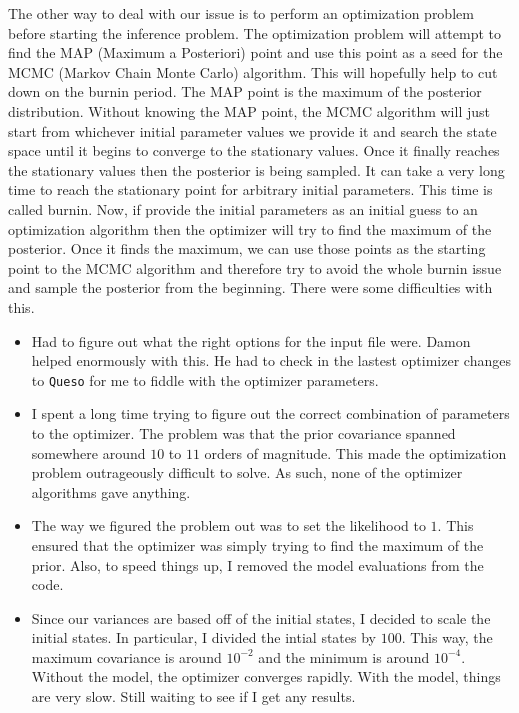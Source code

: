 The other way to deal with our issue is to perform an optimization problem before starting the inference problem.  The optimization problem will attempt to find the MAP (Maximum a Posteriori) point and use this point as a seed for the MCMC (Markov Chain Monte Carlo) algorithm.  This will hopefully help to cut down on the burnin period.  The MAP point is the maximum of the posterior distribution.  Without knowing the MAP point, the MCMC algorithm will just start from whichever initial parameter values we provide it and search the state space until it begins to converge to the stationary values.  Once it finally reaches the stationary values then the posterior is being sampled.  It can take a very long time to reach the stationary point for arbitrary initial parameters.  This time is called burnin.  Now, if provide the initial parameters as an initial guess to an optimization algorithm then the optimizer will try to find the maximum of the posterior.  Once it finds the maximum, we can use those points as the starting point to the MCMC algorithm and therefore try to avoid the whole burnin issue and sample the posterior from the beginning.  There were some difficulties with this.
\begin{itemize}
  \item Had to figure out what the right options for the input file were.  Damon helped enormously with this.  He had to check in the lastest optimizer changes to \texttt{Queso} for me to fiddle with the optimizer parameters.
  \item I spent a long time trying to figure out the correct combination of parameters to the optimizer.  The problem was that the prior covariance spanned somewhere around $10$ to $11$ orders of magnitude.  This made the optimization problem outrageously difficult to solve.  As such, none of the optimizer algorithms gave anything.
  \item The way we figured the problem out was to set the likelihood to $1$.  This ensured that the optimizer was simply trying to find the maximum of the prior.  Also, to speed things up, I removed the model evaluations from the code.
  \item Since our variances are based off of the initial states, I decided to scale the initial states.  In particular, I divided the intial states by $100$.  This way, the maximum covariance is around $10^{-2}$ and the minimum is around $10^{-4}$.  Without the model, the optimizer converges rapidly.  With the model, things are very slow.  Still waiting to see if I get any results.
\end{itemize}


